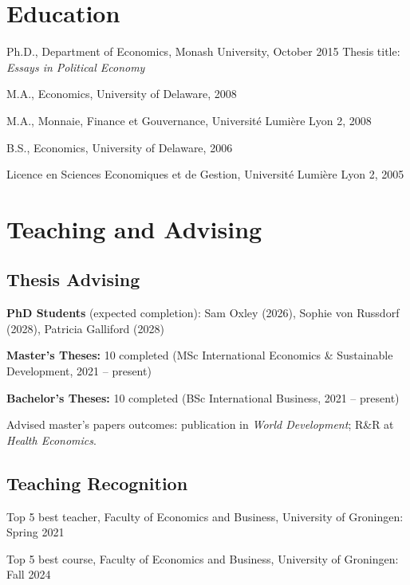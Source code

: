 \documentclass[letterpaper]{article}
\renewenvironment{itemize}{
  \begin{list}{}{
    \setlength{\leftmargin}{1.5em}
  }
}{
  \end{list}
}
\begin{document}
\section*{Education}

\begin{itemize}
	\item Ph.D., Department of Economics, Monash University, October 2015
	\subitem Thesis title: {\emph{Essays in Political Economy}}
	\item M.A., Economics, University of Delaware, 2008
	\item M.A., Monnaie, Finance et Gouvernance, Universit\'e Lumi\`ere Lyon 2, 2008
	\item B.S., Economics, University of Delaware, 2006
	\item Licence en Sciences Economiques et de Gestion, Universit\'e Lumi\`ere Lyon 2, 2005
\end{itemize}


\section*{Teaching and Advising}

\subsection*{Thesis Advising}

\begin{itemize}
\item \textbf{PhD Students} (expected completion): Sam Oxley (2026), Sophie von Russdorf (2028), Patricia Galliford (2028)
\item \textbf{Master's Theses:} 10 completed (MSc International Economics \& Sustainable Development, 2021 -- present)
\item \textbf{Bachelor's Theses:} 10 completed (BSc International Business, 2021 -- present)
\item Advised master's papers outcomes: publication in \textit{World Development}; R\&R at \textit{Health Economics}.
\end{itemize}

\subsection*{Teaching Recognition}

\begin{itemize}
\item Top 5 best teacher, Faculty of Economics and Business, University of Groningen: Spring 2021
\item Top 5 best course, Faculty of Economics and Business, University of Groningen: Fall 2024
\end{itemize}
\end{document}
